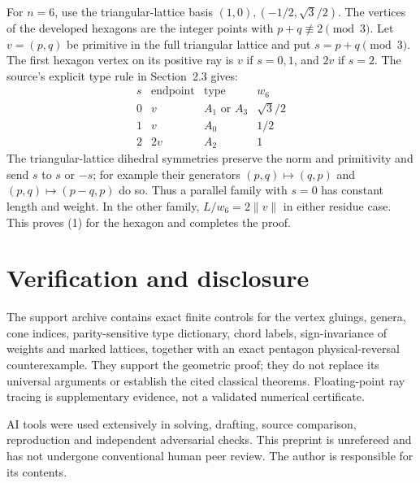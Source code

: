 \documentclass[11pt]{article}
\begin{document}
For \(n=6\), use the triangular-lattice basis \((1,0),(-1/2,\sqrt3/2)\). The vertices of the developed hexagons are the integer points with \(p+q\not\equiv2\pmod3\). Let \(v=(p,q)\) be primitive in the full triangular lattice and put \(s=p+q\pmod3\). The first hexagon vertex on its positive ray is \(v\) if \(s=0,1\), and \(2v\) if \(s=2\). The source's explicit type rule in Section~2.3 gives:
\[
\begin{array}{c|c|c|c}
s&\text{endpoint}&\text{type}&w_6\\ \hline
0&v&A_1\text{ or }A_3&\sqrt3/2\\
1&v&A_0&1/2\\
2&2v&A_2&1
\end{array}
\]
The triangular-lattice dihedral symmetries preserve the norm and primitivity and send \(s\) to \(s\) or \(-s\); for example their generators \((p,q)\mapsto(q,p)\) and \((p,q)\mapsto(p-q,p)\) do so. Thus a parallel family with \(s=0\) has constant length and weight. In the other family, \(L/w_6=2\|v\|\) in either residue case. This proves (1) for the hexagon and completes the proof.


\section*{Verification and disclosure}
The support archive contains exact finite controls for the vertex gluings, genera, cone indices, parity-sensitive type dictionary, chord labels, sign-invariance of weights and marked lattices, together with an exact pentagon physical-reversal counterexample. They support the geometric proof; they do not replace its universal arguments or establish the cited classical theorems. Floating-point ray tracing is supplementary evidence, not a validated numerical certificate.

AI tools were used extensively in solving, drafting, source comparison, reproduction and independent adversarial checks. This preprint is unrefereed and has not undergone conventional human peer review. The author is responsible for its contents.
\end{document}
